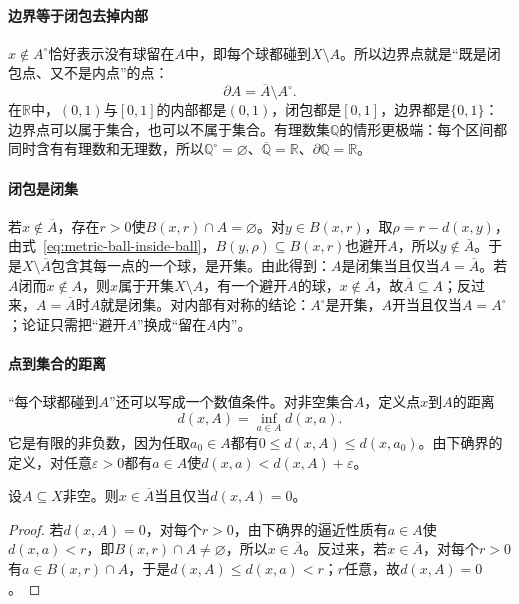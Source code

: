 \paragraph{边界等于闭包去掉内部}
$x\notin A^\circ$恰好表示没有球留在$A$中，即每个球都碰到$X\setminus A$。所以边界点就是“既是闭包点、又不是内点”的点：
\begin{equation}
\label{eq:metric-boundary}
  \partial A=\overline A\setminus A^\circ.
\end{equation}
在$\mathbb R$中，$(0,1)$与$[0,1]$的内部都是$(0,1)$，闭包都是$[0,1]$，边界都是$\{0,1\}$：边界点可以属于集合，也可以不属于集合。有理数集$\mathbb Q$的情形更极端：每个区间都同时含有有理数和无理数，所以$\mathbb Q^\circ=\varnothing$、$\overline{\mathbb Q}=\mathbb R$、$\partial\mathbb Q=\mathbb R$。

\paragraph{闭包是闭集}
若$x\notin\overline A$，存在$r>0$使$B(x,r)\cap A=\varnothing$。对$y\in B(x,r)$，取$\rho=r-d(x,y)$，由式~\eqref{eq:metric-ball-inside-ball}，$B(y,\rho)\subseteq B(x,r)$也避开$A$，所以$y\notin\overline A$。于是$X\setminus\overline A$包含其每一点的一个球，是开集。由此得到：$A$是闭集当且仅当$A=\overline A$。若$A$闭而$x\notin A$，则$x$属于开集$X\setminus A$，有一个避开$A$的球，$x\notin\overline A$，故$\overline A\subseteq A$；反过来，$A=\overline A$时$A$就是闭集。对内部有对称的结论：$A^\circ$是开集，$A$开当且仅当$A=A^\circ$；论证只需把“避开$A$”换成“留在$A$内”。

\paragraph{点到集合的距离}
“每个球都碰到$A$”还可以写成一个数值条件。对非空集合$A$，定义点$x$到$A$的距离
\begin{equation}
\label{eq:metric-distance-to-set}
  d(x,A)=\inf_{a\in A}d(x,a).
\end{equation}
它是有限的非负数，因为任取$a_0\in A$都有$0\leq d(x,A)\leq d(x,a_0)$。由下确界的定义，对任意$\varepsilon>0$都有$a\in A$使$d(x,a)<d(x,A)+\varepsilon$。

\begin{lemma}[距离为零与闭包]
\label{lem:metric-distance-closure}
设$A\subseteq X$非空。则$x\in\overline A$当且仅当$d(x,A)=0$。
\end{lemma}

\begin{proof}
若$d(x,A)=0$，对每个$r>0$，由下确界的逼近性质有$a\in A$使$d(x,a)<r$，即$B(x,r)\cap A\neq\varnothing$，所以$x\in\overline A$。反过来，若$x\in\overline A$，对每个$r>0$有$a\in B(x,r)\cap A$，于是$d(x,A)\leq d(x,a)<r$；$r$任意，故$d(x,A)=0$。
\end{proof}

